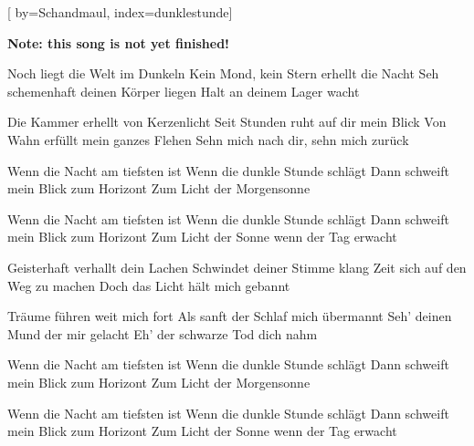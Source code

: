 
[%
    by={Schandmaul},
    index={dunklestunde}]


    \label{dunklestunde}

    \textbf{Note: this song is not yet finished!}

    \beginverse
        Noch liegt die Welt im Dunkeln
        Kein Mond, kein Stern erhellt die Nacht
        Seh schemenhaft deinen Körper liegen
        Halt an deinem Lager wacht

        Die Kammer erhellt von Kerzenlicht
        Seit Stunden ruht auf dir mein Blick
        Von Wahn erfüllt mein ganzes Flehen
        Sehn mich nach dir, sehn mich zurück
    \endverse

    \beginchorus
        Wenn die Nacht am tiefsten ist
        Wenn die dunkle Stunde schlägt
        Dann schweift mein Blick zum Horizont
        Zum Licht der Morgensonne

        Wenn die Nacht am tiefsten ist
        Wenn die dunkle Stunde schlägt
        Dann schweift mein Blick zum Horizont
        Zum Licht der Sonne wenn der Tag erwacht
    \endchorus

    \beginverse
        Geisterhaft verhallt dein Lachen
        Schwindet deiner Stimme klang
        Zeit sich auf den Weg zu machen
        Doch das Licht hält mich gebannt

        Träume führen weit mich fort
        Als sanft der Schlaf mich übermannt
        Seh' deinen Mund der mir gelacht
        Eh' der schwarze Tod dich nahm
    \endverse

    \beginchorus
        Wenn die Nacht am tiefsten ist
        Wenn die dunkle Stunde schlägt
        Dann schweift mein Blick zum Horizont
        Zum Licht der Morgensonne

        Wenn die Nacht am tiefsten ist
        Wenn die dunkle Stunde schlägt
        Dann schweift mein Blick zum Horizont
        Zum Licht der Sonne wenn der Tag erwacht
    \endchorus
\endsong
